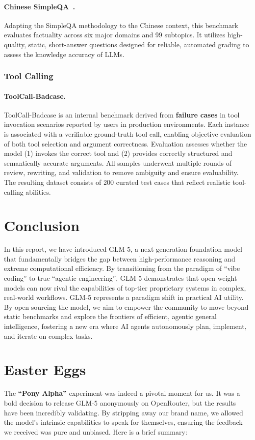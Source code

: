 \documentclass{article}
\theoremstyle{definition}
\begin{document}
\paragraph{Chinese SimpleQA~\citep{chinesesimpleQA}.} Adapting the SimpleQA methodology to the Chinese context, this benchmark evaluates factuality across six major domains and 99 subtopics. It utilizes high-quality, static, short-answer questions designed for reliable, automated grading to assess the knowledge accuracy of LLMs.

\subsubsection{Tool Calling}
\paragraph{ToolCall-Badcase.} ToolCall-Badcase is an internal benchmark derived from \textbf{failure cases} in tool invocation scenarios reported by users in production environments. Each instance is associated with a verifiable ground-truth tool call, enabling objective evaluation of both tool selection and argument correctness.
Evaluation assesses whether the model (1) invokes the correct tool and (2) provides correctly structured and semantically accurate arguments. 
All samples underwent multiple rounds of review, rewriting, and validation to remove ambiguity and ensure evaluability. The resulting dataset consists of 200 curated test cases that reflect realistic tool-calling abilities.
\section{Conclusion}

In this report, we have introduced GLM-5, a next-generation foundation model that fundamentally bridges the gap between high-performance reasoning and extreme computational efficiency. By transitioning from the paradigm of ``vibe coding'' to true ``agentic engineering'', GLM-5 demonstrates that open-weight models can now rival the capabilities of top-tier proprietary systems in complex, real-world workflows.
GLM-5 represents a paradigm shift in practical AI utility. By open-sourcing the model, we aim to empower the community to move beyond static benchmarks and explore the frontiers of efficient, agentic general intelligence, fostering a new era where AI agents autonomously plan, implement, and iterate on complex tasks.

\section{Easter Eggs}
The \textbf{``Pony Alpha''} experiment was indeed a pivotal moment for us. It was a bold decision to release GLM-5 anonymously on OpenRouter, but the results have been incredibly validating. By stripping away our brand name, we allowed the model's intrinsic capabilities to speak for themselves, ensuring the feedback we received was pure and unbiased.
Here is a brief summary:
\end{document}
